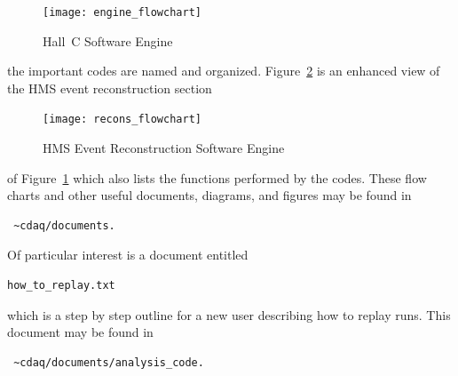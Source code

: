 \begin{figure}
\texttt{[image: engine\_flowchart]}
\caption{Hall~C Software Engine}
\label{fig:7.8}
\end{figure}

the important codes are named and organized.
Figure~\ref{fig:7.9} is an enhanced view of the HMS event reconstruction section

\begin{figure}
\texttt{[image: recons\_flowchart]}
\caption{HMS Event Reconstruction Software Engine\label{fig:7.9} }
\end{figure}

of Figure~\ref{fig:7.8} which also lists the functions performed by the codes.
These flow charts and other useful documents, diagrams, and
figures may be found in
\begin{verbatim} ~cdaq/documents. \end{verbatim}

Of particular interest is a document entitled \begin{verbatim}
how_to_replay.txt \end{verbatim}
which
is a step by step outline for a new user describing how to replay runs.
This document may be found in
\begin{verbatim} ~cdaq/documents/analysis_code. \end{verbatim}

